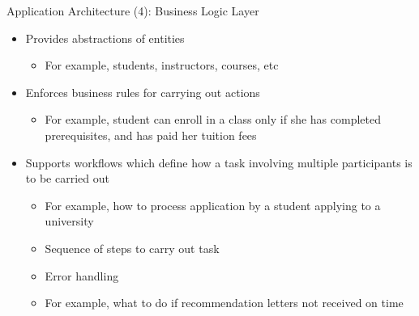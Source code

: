 \documentclass[aspectratio=169, xcolor=dvipsnames]{beamer}
\begin{document}
\begin{frame}{Application Architecture (4): Business Logic Layer}
    \begin{itemize}[<+->]
        \item Provides abstractions of entities
        \begin{itemize}
            \item[$\triangleright$] For example, students, instructors, courses, etc
        \end{itemize}
        \item Enforces business rules for carrying out actions
        \begin{itemize}
            \item[$\triangleright$] For example, student can enroll in a class only if she has completed prerequisites, and has paid her tuition fees
        \end{itemize}
        \item Supports workflows which define how a task involving multiple participants is to be carried out
        \begin{itemize}
            \item[$\triangleright$] For example, how to process application by a student applying to a university
            \item[$\triangleright$] Sequence of steps to carry out task
            \item[$\triangleright$] Error handling
            \item[$\triangleright$] For example, what to do if recommendation letters not received on time
        \end{itemize}
    \end{itemize}
\end{frame}
\end{document}
